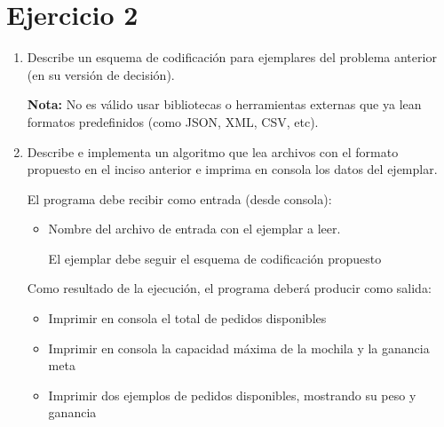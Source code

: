 \section{Ejercicio 2}

\begin{tcolorbox}[enunciado]
\begin{enumerate}[label=(\alph*), leftmargin=*]
    \item Describe un esquema de codificación para ejemplares del problema anterior (en su versión de decisión).
    
    \textbf{Nota:} No es válido usar bibliotecas o herramientas externas que ya lean formatos predefinidos (como JSON, XML, CSV, etc).

    \item Describe e implementa un algoritmo que lea archivos con el formato propuesto en el inciso anterior e imprima en consola los datos del ejemplar.

    El programa debe recibir como entrada (desde consola):
    \begin{itemize}[leftmargin=*]
        \item Nombre del archivo de entrada con el ejemplar a leer.
        
        El ejemplar debe seguir el esquema de codificación propuesto
    \end{itemize}

    Como resultado de la ejecución, el programa deberá producir como salida:
    \begin{itemize}[leftmargin=*]
        \item Imprimir en consola el total de pedidos disponibles
        \item Imprimir en consola la capacidad máxima de la mochila y la ganancia meta
        \item Imprimir dos ejemplos de pedidos disponibles, mostrando su peso y ganancia
    \end{itemize}
\end{enumerate}
\end{tcolorbox}

